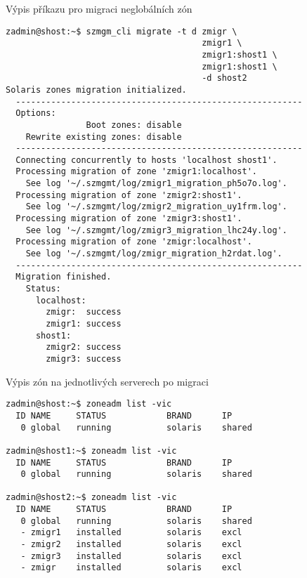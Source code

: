 \begin{listing}[ht]
  \caption{Výpis příkazu pro migraci neglobálních zón}  
  \begin{verbatim}
zadmin@shost:~$ szmgm_cli migrate -t d zmigr \
                                       zmigr1 \
                                       zmigr1:shost1 \
                                       zmigr1:shost1 \
                                       -d shost2
Solaris zones migration initialized.
  ---------------------------------------------------------
  Options:
                Boot zones: disable
    Rewrite existing zones: disable
  ---------------------------------------------------------
  Connecting concurrently to hosts 'localhost shost1'.
  Processing migration of zone 'zmigr1:localhost'. 
    See log '~/.szmgmt/log/zmigr1_migration_ph5o7o.log'. 
  Processing migration of zone 'zmigr2:shost1'. 
    See log '~/.szmgmt/log/zmigr2_migration_uy1frm.log'.
  Processing migration of zone 'zmigr3:shost1'. 
    See log '~/.szmgmt/log/zmigr3_migration_lhc24y.log'.
  Processing migration of zone 'zmigr:localhost'. 
    See log '~/.szmgmt/log/zmigr_migration_h2rdat.log'.
  ---------------------------------------------------------
  Migration finished.
    Status:
      localhost:
        zmigr:  success
        zmigr1: success
      shost1:
        zmigr2: success
        zmigr3: success
  \end{verbatim}
  \label{code:test:migration}
\end{listing}

\begin{listing}[ht]
  \caption{Výpis zón na jednotlivých serverech po migraci}  
  \begin{verbatim}
zadmin@shost:~$ zoneadm list -vic
  ID NAME     STATUS            BRAND      IP    
   0 global   running           solaris    shared

zadmin@shost1:~$ zoneadm list -vic
  ID NAME     STATUS            BRAND      IP    
   0 global   running           solaris    shared
   
zadmin@shost2:~$ zoneadm list -vic
  ID NAME     STATUS            BRAND      IP    
   0 global   running           solaris    shared
   - zmigr1   installed         solaris    excl  
   - zmigr2   installed         solaris    excl
   - zmigr3   installed         solaris    excl  
   - zmigr    installed         solaris    excl  
  \end{verbatim}
  \label{code:test:migration:list}
\end{listing}

